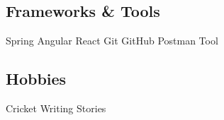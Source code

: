 \documentclass[]{deedy-resume-openfont}
\begin{document}
\begin{minipage}[t]{0.33\textwidth}

\subsection{Frameworks \& Tools}
\textbullet{}Spring \textbullet{} Angular \textbullet{} React \textbullet{} Git \textbullet{}  GitHub \textbullet{}Postman Tool 

\sectionsep


\subsection{Hobbies}
  \textbullet{}Cricket \textbullet{} Writing Stories
\sectionsep

%
%

\end{minipage} 
\hfill
\end{document}
